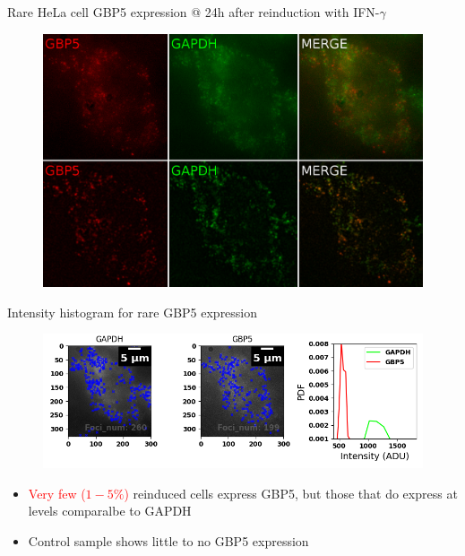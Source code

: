 \documentclass[aspectratio=1610]{beamer}					%
\begin{document}
\begin{frame}{Rare HeLa cell GBP5 expression @ 24h after reinduction with IFN-$\gamma$}
\begin{figure}
\includegraphics[width=12cm]{Stains.png}
\end{figure}
\end{frame}

\begin{frame}{Intensity histogram for rare GBP5 expression}
\begin{figure}
\includegraphics[width=14cm]{Detection.png}
\end{figure}
\begin{itemize}
\item \textcolor{red}{Very few ($1-5\%$)} reinduced cells express GBP5, but those that do express at levels comparalbe to GAPDH
\item Control sample shows little to no GBP5 expression
\end{itemize}
\end{frame}
\end{document}
